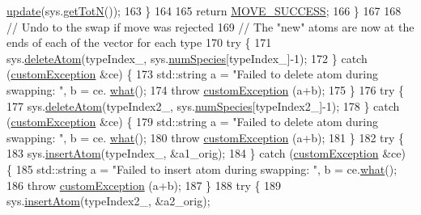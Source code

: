 \begin{DoxyCode}
      \hyperlink{classwala_a5eb2622be6a9e89f5e59ba0b15aca4bd}{update}(sys.\hyperlink{classsim_system_a37dd827f4057049763351510147b9f1d}{getTotN}());
163                                 \}
164                                                 
165         \textcolor{keywordflow}{return} \hyperlink{moves_8h_ae8285cbddc5d21f73f49dcbad82a775a}{MOVE\_SUCCESS};
166     \}
167                 
168                 \textcolor{comment}{// Undo to the swap if move was rejected}
169                 \textcolor{comment}{// The "new" atoms are now at the ends of each of the vector for each type}
170                 \textcolor{keywordflow}{try} \{
171                 sys.\hyperlink{classsim_system_acabf4fc5b5b90bba62e1449ddb3646c6}{deleteAtom}(typeIndex\_, sys.\hyperlink{classsim_system_a9eea865e6dc1cff377b1e79c4d9c23f0}{numSpecies}[typeIndex\_]-1);
172     \} \textcolor{keywordflow}{catch} (\hyperlink{classcustom_exception}{customException} &ce) \{
173                 std::string a = \textcolor{stringliteral}{"Failed to delete atom during swapping: "}, b = ce.
      \hyperlink{classcustom_exception_aeb6ab5848b038adfc68fde86a512f691}{what}();
174                 \textcolor{keywordflow}{throw} \hyperlink{classcustom_exception}{customException} (a+b);
175     \}
176     \textcolor{keywordflow}{try} \{
177         sys.\hyperlink{classsim_system_acabf4fc5b5b90bba62e1449ddb3646c6}{deleteAtom}(typeIndex2\_, sys.\hyperlink{classsim_system_a9eea865e6dc1cff377b1e79c4d9c23f0}{numSpecies}[typeIndex2\_]-1);
178     \} \textcolor{keywordflow}{catch} (\hyperlink{classcustom_exception}{customException} &ce) \{
179                 std::string a = \textcolor{stringliteral}{"Failed to delete atom during swapping: "}, b = ce.
      \hyperlink{classcustom_exception_aeb6ab5848b038adfc68fde86a512f691}{what}();
180         \textcolor{keywordflow}{throw} \hyperlink{classcustom_exception}{customException} (a+b);
181     \}
182     \textcolor{keywordflow}{try} \{
183                 sys.\hyperlink{classsim_system_a6c1e86f585f3a52aa82b6394ffbf1c6a}{insertAtom}(typeIndex\_, &a1\_orig);
184     \} \textcolor{keywordflow}{catch} (\hyperlink{classcustom_exception}{customException} &ce) \{
185         std::string a = \textcolor{stringliteral}{"Failed to insert atom during swapping: "}, b = ce.\hyperlink{classcustom_exception_aeb6ab5848b038adfc68fde86a512f691}{what}();
186         \textcolor{keywordflow}{throw} \hyperlink{classcustom_exception}{customException} (a+b);
187     \}
188     \textcolor{keywordflow}{try} \{
189                 sys.\hyperlink{classsim_system_a6c1e86f585f3a52aa82b6394ffbf1c6a}{insertAtom}(typeIndex2\_, &a2\_orig);

\end{DoxyCode}
